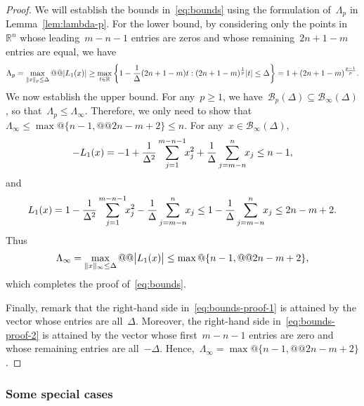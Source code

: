 \documentclass{article}
\numberwithin{equation}{section}
\theoremstyle{definition}
\theoremstyle{plain}
\theoremstyle{remark}
\newcommand*{\abs}[2][]{#1\lvert#2#1\rvert}
\newcommand*{\norm}[2][]{#1\lVert#2#1\rVert}
\newcommand*{\set}[2][]{#1\{#2#1\}}
\newcommand*{\R}{\mathbb{R}}
\newcommand*{\lagp}[1][]{L\ifblank{#1}{}{_{#1}}}
\begin{document}
\begin{proof}
    We will establish the bounds in~\eqref{eq:bounds} using the formulation of~$\Lambda_p$ in Lemma~\ref{lem:lambda-p}.
    For the lower bound, by considering only the points in~$\R^n$ whose leading~$m - n - 1$ entries are zeros and whose remaining~$2n + 1 - m$ entries are equal, we have
    \begin{equation*}
        \Lambda_p = \max_{\norm{x}_p \le \Delta} @@ \abs{\lagp[1](x)} \ge \max_{t \in \R} \set[\bigg]{1 - \frac{1}{\Delta} (2n + 1 - m) t : (2n + 1 - m)^{\frac{1}{p}}\abs{t} \le \Delta} = 1 + (2n + 1 - m)^{\frac{p - 1}{p}}.
    \end{equation*}
    We now establish the upper bound.
    For any~$p \ge 1$, we have~$\mathcal{B}_p(\Delta) \subseteq \mathcal{B}_{\infty}(\Delta)$, so that~$\Lambda_p \le \Lambda_{\infty}$.
    Therefore, we only need to show that~$\Lambda_{\infty} \le \max @ \set{n - 1, @@ 2n - m + 2} \le n$.
    For any~$x \in \mathcal{B}_{\infty}(\Delta)$,
    \begin{equation}
        \label{eq:bounds-proof-1}
        -\lagp[1](x) = -1 + \frac{1}{\Delta^2} \sum_{j = 1}^{m - n - 1} \!\! x_j^2 + \frac{1}{\Delta} \sum_{j = m - n}^n \!\! x_j \le n-1,
    \end{equation}
    and
    \begin{equation}
        \label{eq:bounds-proof-2}
        \lagp[1](x) = 1 - \frac{1}{\Delta^2} \sum_{j = 1}^{m - n - 1} \!\! x_j^2 - \frac{1}{\Delta} \sum_{j = m - n}^n \!\! x_j \le 1 -  \frac{1}{\Delta} \sum_{j = m - n}^n \!\! x_j \le 2n-m+2.
    \end{equation}
    Thus
    \begin{equation*}
        \Lambda_{\infty} = \max_{\norm{x}_{\infty} \le \Delta} @@ \abs[\big]{\lagp[1](x)} \le \max @ \set{n - 1, @@ 2n - m + 2},
    \end{equation*}
    which completes the proof of~\eqref{eq:bounds}.

    Finally, remark that the right-hand side in~\eqref{eq:bounds-proof-1} is attained by the vector whose entries are all~$\Delta$.
    Moreover, the right-hand side in~\eqref{eq:bounds-proof-2} is attained by the vector whose first~$m - n - 1$ entries are zero and whose remaining entries are all~$-\Delta$.
    Hence,~$\Lambda_{\infty} = \max @ \set{n - 1, @@ 2n - m + 2}$.
\end{proof}

\subsubsection{Some special cases}
\end{document}
